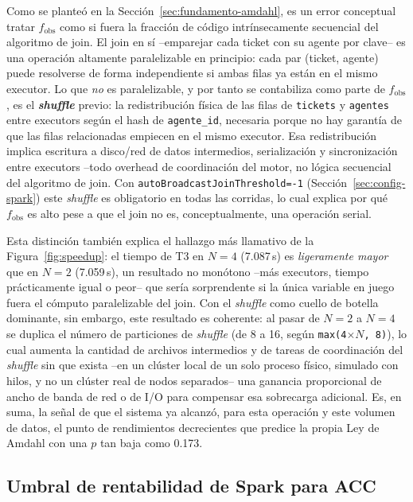 \documentclass[11pt,a4paper]{article}
\begin{document}
Como se plante\'o en la Secci\'on~\ref{sec:fundamento-amdahl}, es un error
conceptual tratar $f_{\text{obs}}$ como si fuera la fracci\'on de
c\'odigo intr\'insecamente secuencial del algoritmo de join. El join en s\'i
--emparejar cada ticket con su agente por clave-- es una operaci\'on
altamente paralelizable en principio: cada par (ticket, agente) puede
resolverse de forma independiente si ambas filas ya est\'an en el mismo
executor. Lo que \emph{no} es paralelizable, y por tanto se contabiliza como
parte de $f_{\text{obs}}$, es el \textbf{\emph{shuffle}} previo: la
redistribuci\'on f\'isica de las filas de \texttt{tickets} y
\texttt{agentes} entre executors seg\'un el hash de \texttt{agente\_id},
necesaria porque no hay garant\'ia de que las filas relacionadas empiecen en
el mismo executor. Esa redistribuci\'on implica escritura a disco/red de
datos intermedios, serializaci\'on y sincronizaci\'on entre executors --todo
overhead de coordinaci\'on del motor, no l\'ogica secuencial del algoritmo de
join. Con \texttt{autoBroadcastJoinThreshold=-1} (Secci\'on~\ref{sec:config-spark})
este \emph{shuffle} es obligatorio en todas las corridas, lo cual explica por
qu\'e $f_{\text{obs}}$ es alto pese a que el join no es, conceptualmente, una
operaci\'on serial.

Esta distinci\'on tambi\'en explica el hallazgo m\'as llamativo de la
Figura~\ref{fig:speedup}: el tiempo de T3 en $N=4$ (7.087\,s) es
\emph{ligeramente mayor} que en $N=2$ (7.059\,s), un resultado no mon\'otono
--m\'as executors, tiempo pr\'acticamente igual o peor-- que ser\'ia
sorprendente si la \'unica variable en juego fuera el c\'omputo paralelizable
del join. Con el \emph{shuffle} como cuello de botella dominante, sin
embargo, este resultado es coherente: al pasar de $N=2$ a $N=4$ se duplica el
n\'umero de particiones de \emph{shuffle} (de 8 a 16, seg\'un
\texttt{max(4$\times N$, 8)}), lo cual aumenta la cantidad de archivos
intermedios y de tareas de coordinaci\'on del \emph{shuffle} sin que exista
--en un cl\'uster local de un solo proceso f\'isico, simulado con hilos, y no
un cl\'uster real de nodos separados-- una ganancia proporcional de ancho de
banda de red o de I/O para compensar esa sobrecarga adicional. Es, en suma,
la se\~nal de que el sistema ya alcanz\'o, para esta operaci\'on y este
volumen de datos, el punto de rendimientos decrecientes que predice la propia
Ley de Amdahl con una $p$ tan baja como 0.173.

\subsection{Umbral de rentabilidad de Spark para ACC}
\end{document}
